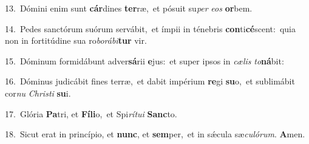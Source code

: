 {\numbfont\textcolor{\numbcolor}{13.}}~Dómini enim sunt \textbf{cár}\-dines \textbf{ter}\-ræ,~\star et pósuit su\textit{per} \textit{e}\-\textit{os} \textbf{or}\-bem.\par
{\numbfont\textcolor{\numbcolor}{14.}}~Pedes sanctórum suórum servábit,~\dagger et ímpii in ténebris \textbf{con}\-ti\-\textbf{cé}\-scent:~\star quia non in fortitúdine sua ro\-\textit{bo}\-\textit{rá}\textit{bi}\textbf{tur} vir.\par
{\numbfont\textcolor{\numbcolor}{15.}}~Dóminum formidábunt adver\-\textbf{sá}\-rii \textbf{e}\-jus:~\star et super ipsos in \textit{cæ}\-\textit{lis} \textit{to}\-\textbf{ná}bit:\par
{\numbfont\textcolor{\numbcolor}{16.}}~Dóminus judicábit fines terræ,~\dagger et dabit impérium \textbf{re}\-gi \textbf{su}\-o,~\star et sublimábit cor\textit{nu} \textit{Chris}\-\textit{ti} \textbf{su}\-i.\par
{\numbfont\textcolor{\numbcolor}{17.}}~Glória \textbf{Pa}\-tri, et \textbf{Fí}\-\textbf{li}o,~\star et Spi\-\textit{rí}\-\textit{tu}\textit{i} \textbf{Sanc}\-to.\par
{\numbfont\textcolor{\numbcolor}{18.}}~Sicut erat in princípio, et \textbf{nunc}\-, et \textbf{sem}\-per,~\star et in sǽcula sæ\-\textit{cu}\-\textit{ló}\textit{rum}. \textbf{A}\-men.\par

